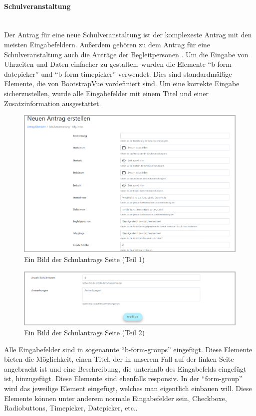 \paragraph{Schulveranstaltung}
~\\
Der Antrag für eine neue Schulveranstaltung ist der komplexeste Antrag mit den meisten Eingabefeldern. Außerdem gehören zu dem Antrag für eine Schulveranstaltung auch die Anträge der Begleitpersonen . Um die Eingabe von Uhrzeiten und Daten einfacher zu gestalten, wurden die Elemente \enquote{b-form-datepicker} und \enquote{b-form-timepicker} verwendet. Dies sind standardmäßige Elemente, die von BootstrapVue vordefiniert sind. Um eine korrekte Eingabe sicherzustellen, wurde alle Eingabefelder mit einem Titel und einer Zusatzinformation ausgestattet.
\begin{figure}[H]
	\centering
	\includegraphics[width=1\linewidth]{images/website/schul_1}
	\caption[Neuer Schulantrag]{Ein Bild der Schulantrags Seite (Teil 1)}
	\label{fig:schulantrag1}
\end{figure}
\begin{figure}[H]
	\centering
	\includegraphics[width=1\linewidth]{images/website/schul_2}
	\caption[Neuer Schulantrag]{Ein Bild der Schulantrags Seite (Teil 2)}
	\label{fig:schulantrag2}
\end{figure}
Alle Eingabefelder sind in sogenannte \enquote{b-form-groups} eingefügt. Diese Elemente bieten die Möglichkeit, einen Titel, der in unserem Fall auf der linken Seite angebracht ist und eine Beschreibung, die unterhalb des Eingabefelds eingefügt ist, hinzugefügt. Diese Elemente sind ebenfalls responsiv. In der \enquote{form-group} wird das jeweilige Element eingefügt, welches man eigentlich einbauen will. Diese Elemente können unter anderem normale Eingabefelder sein, Checkboxe, Radiobuttons, Timepicker, Datepicker, etc.. 
